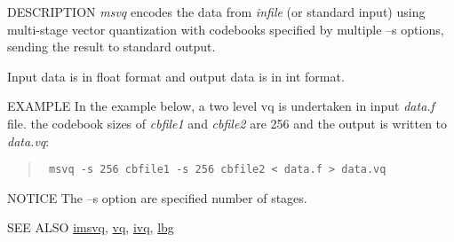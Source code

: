 \begin{synopsis}
\item [msvq] [ --l $L$ ] [ --n $N$ ][ --s $S \;$ {\em cbfile} ] [ --q ] [ {\em infile} ]
\end{synopsis}

\begin{qsection}{DESCRIPTION}
{\em msvq} encodes the data from {\em infile} (or standard input) 
using multi-stage vector quantization 
with codebooks specified by multiple --s options,
sending the result to standard output.

Input data is in float format and output data is in int format.
\end{qsection}

\begin{options}
\end{options}

\begin{qsection}{EXAMPLE}
In the example below, a two level vq is undertaken in input {\em data.f}
file. the codebook sizes of 
{\em cbfile1} and {\em cbfile2} are 256 and the output is written
to {\em data.vq}:
\begin{quote}
\verb! msvq -s 256 cbfile1 -s 256 cbfile2 < data.f > data.vq!
\end{quote} 
\end{qsection}

\begin{qsection}{NOTICE}
The --s option are specified number of stages.
\end{qsection}

\begin{qsection}{SEE ALSO}
\hyperlink{imsvq}{imsvq},
\hyperlink{vq}{vq},
\hyperlink{ivq}{ivq},
\hyperlink{lbg}{lbg}
\end{qsection}
